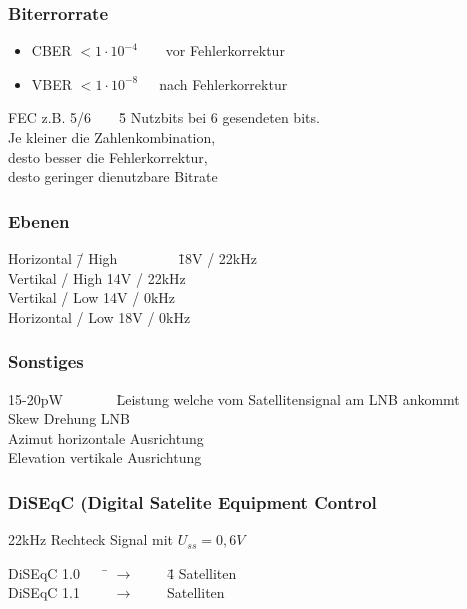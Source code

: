 \documentclass[12pt,a4paper]{article}
\begin{document}
\subsubsection{Biterrorrate}
\begin{itemize}
\item CBER $<1 \cdot 10^{-4}$~~~~vor Fehlerkorrektur
\item VBER $<1 \cdot 10^{-8}$~~~nach Fehlerkorrektur    
\end{itemize}

\begin{tabbing}
FEC z.B. 5/6~~~~\= 5 Nutzbits bei 6 gesendeten bits. \\ \> Je kleiner die Zahlenkombination, \\ \> desto besser die Fehlerkorrektur, \\ \> desto geringer dienutzbare Bitrate
\end{tabbing}

\subsubsection{Ebenen}
\begin{tabbing}
Horizontal \= / High~~~~~~~~ \= 18V / 22kHz \\
Vertikal \> / High \> 14V / 22kHz \\
Vertikal \> / Low \> 14V / 0kHz \\
Horizontal \> / Low \> 18V / 0kHz \\
\end{tabbing}

\subsubsection{Sonstiges}
\begin{tabbing}
15-20pW~~~~~~~ \= Leistung welche vom Satellitensignal am LNB ankommt\\
Skew \> Drehung LNB\\
Azimut \> horizontale Ausrichtung\\
Elevation \> vertikale Ausrichtung\\
\end{tabbing}

\subsubsection{DiSEqC (Digital Satelite Equipment Control}
22kHz Rechteck Signal mit $U_{ss}=0,6V$
\begin{tabbing}
DiSEqC 1.0~~~~\= $\rightarrow$~~~~ \= 4 Satelliten \\
DiSEqC 1.1~~~~\> $\rightarrow$~~~~  Satelliten \\
\end{tabbing}
\end{document}
